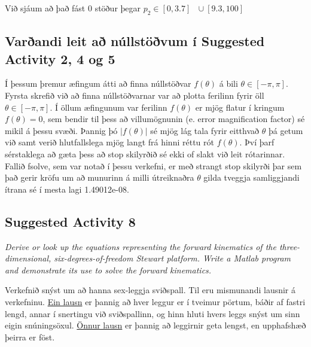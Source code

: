 \documentclass[11pt]{article}
\begin{document}
    Við sjáum að það fást 0 stöður þegar
\(p_2 \in [0, 3.7] \text{ } \cup [9.3, 100]\)

    \hypertarget{varuxf0andi-leit-auxf0-nuxfallstuxf6uxf0vum-uxed-suggested-activity-2-4-og-5}{%
\subsection*{Varðandi leit að núllstöðvum í Suggested Activity 2, 4 og
5}\label{varuxf0andi-leit-auxf0-nuxfallstuxf6uxf0vum-uxed-suggested-activity-2-4-og-5}}

Í þessum þremur æfingum átti að finna núllstöðvar \(f(\theta)\) á bili
$ \theta \in[-\pi,\pi]$. Fyrsta skrefið við að finna núllstöðvarnar
var að plotta ferilinn fyrir öll \(\theta \in [-\pi, \pi]\). Í öllum
æfingunum var ferilinn \(f(\theta)\) er mjög flatur í kringum
\(f(\theta) = 0\), sem bendir til þess að villumögnunin (e. error
magnification factor) sé mikil á þessu svæði. Þannig þó \(|f(\theta)|\)
sé mjög lág tala fyrir eitthvað \(\theta\) þá getum við samt verið
hlutfallslega mjög langt frá hinni réttu rót \(f(\theta)\). Því þarf
sérstaklega að gæta þess að stop skilyrðið sé ekki of slakt við leit
rótarinnar. Fallið fsolve, sem var notað í þessu verkefni, er með
strangt stop skilyrði þar sem það gerir kröfu um að munurinn á milli
útreiknaðra \(\theta\) gilda tveggja samliggjandi ítrana sé í mesta lagi
1.49012e-08.

\newpage
    \hypertarget{suggested-activity-8}{%
\subsection*{Suggested Activity 8}\label{suggested-activity-8}}

\emph{Derive or look up the equations representing the forward
kinematics of the three-dimensional, six-degrees-of-freedom Stewart
platform. Write a Matlab program and demonstrate its use to solve the
forward kinematics.}

Verkefnið snýst um að hanna sex-leggja sviðspall. Til eru mismunandi
lausnir á verkefninu.
\href{https://www.youtube.com/watch?v=PIl8Epy9xIw\&t=34s}{Ein lausn} er
þannig að hver leggur er í tveimur pörtum, báðir af fastri lengd, annar
í snertingu við sviðspallinn, og hinn hluti hvers leggs snýst um sinn
eigin snúningsöxul.
\href{https://www.youtube.com/watch?v=PIl8Epy9xIw\&t=34s}{Önnur lausn}
er þannig að leggirnir geta lengst, en upphafshæð þeirra er föst.
\end{document}
